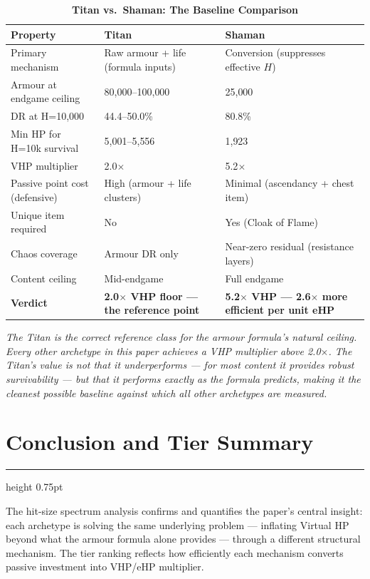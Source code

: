 \documentclass[12pt, letterpaper]{article}
\newcommand{\newsection}[1]{%
    \newpage
    \section{#1}
    \hrule height 0.75pt
    \vspace{4pt}
}
\begin{document}
\begin{table}[htbp]
\centering
\caption{\textbf{Titan vs.\ Shaman: The Baseline Comparison}}
\begin{tabular}{lll}
\toprule
\textbf{Property} & \textbf{Titan} & \textbf{Shaman} \\
\midrule
\rowcolor{rowalt} Primary mechanism & Raw armour + life (formula inputs) & Conversion (suppresses effective $H$) \\
Armour at endgame ceiling & 80{,}000--100{,}000 & 25{,}000 \\
\rowcolor{rowalt} DR at H=10{,}000 & 44.4--50.0\% & 80.8\% \\
Min HP for H=10k survival & 5{,}001--5{,}556 & 1{,}923 \\
\rowcolor{rowalt} VHP multiplier & 2.0$\times$ & 5.2$\times$ \\
Passive point cost (defensive) & High (armour + life clusters) & Minimal (ascendancy + chest item) \\
\rowcolor{rowalt} Unique item required & No & Yes (Cloak of Flame) \\
Chaos coverage & Armour DR only & Near-zero residual (resistance layers) \\
\rowcolor{rowalt} Content ceiling & Mid-endgame & Full endgame \\
\rowcolor{rowhi} \textbf{Verdict} & \textbf{2.0$\times$ VHP floor --- the reference point} & \textbf{5.2$\times$ VHP --- 2.6$\times$ more efficient per unit eHP} \\
\bottomrule
\end{tabular}
\smallskip
\begin{minipage}{\linewidth}
\small\textit{The Titan is the correct reference class for the armour formula's natural ceiling. Every other archetype in this paper achieves a VHP multiplier above 2.0$\times$. The Titan's value is not that it underperforms --- for most content it provides robust survivability --- but that it performs exactly as the formula predicts, making it the cleanest possible baseline against which all other archetypes are measured.}
\end{minipage}
\end{table}

\newsection{Conclusion and Tier Summary}

The hit-size spectrum analysis confirms and quantifies the paper's central insight: each archetype is solving the same underlying problem --- inflating Virtual HP beyond what the armour formula alone provides --- through a different structural mechanism. The tier ranking reflects how efficiently each mechanism converts passive investment into VHP/eHP multiplier.
\end{document}

